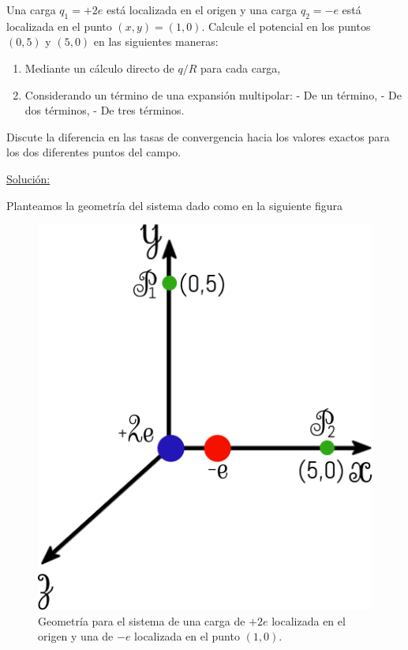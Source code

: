 \documentclass[a4paper,11pt]{article}
\numberwithin{equation}{section}
\begin{document}
Una carga $q_1 = + 2e$ está localizada en el origen y una carga $q_2 = - e$ está 
localizada en el punto $(x,y) = (1,0)$. Calcule el potencial en los puntos $(0,5)$
y $(5,0)$ en las siguientes maneras:

\begin{enumerate}[label=\textbf{(\alph*)}]
\item Mediante un cálculo directo de $q/R$ para cada carga,
\item Considerando un término de una expansión multipolar:
\subitem - De un término,
\subitem - De dos términos,
\subitem - De tres términos.
\end{enumerate}

Discute la diferencia en las tasas de convergencia hacia los valores exactos para 
los dos diferentes puntos del campo.

\vspace{.3cm}

\underline{Solución:} \vspace{.3cm}

Planteamos la geometría del sistema dado como en la siguiente figura

\begin{figure}[H]
 \center 
 \includegraphics[scale=0.4]{problema6fig1}
 \caption{Geometría para el sistema de una carga de $+2e$ localizada en el origen y 
 una de $-e$ localizada en el punto $(1,0)$.}
\end{figure}
\end{document}
